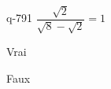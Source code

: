 \begin{truefalse}{q-791}
$\dfrac{\sqrt{2}}{\sqrt{8}-\sqrt{2}}=1$
\item* Vrai
\item Faux
\end{truefalse}

